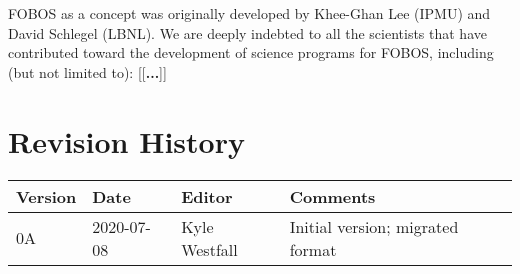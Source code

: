 \documentclass[11pt,a4paper,twoside,onecolumn,openany,final,oldfontcommands]{memoir}
\newcommand{\edit}[2][todo]{{\color{#1}[[{\bf #2}]]}}
\begin{document}
FOBOS as a concept was originally developed by Khee-Ghan Lee (IPMU) and David Schlegel (LBNL).  We are deeply indebted to all the scientists that have contributed toward the development of science programs for FOBOS, including (but not limited to): \edit{...}

\newpage

\chapter*{Revision History}

\begin{table}[hp]{%
\begin{tabular}{l | l | l |  p{22pc}} \toprule
{\bf Version} & {\bf Date} & {\bf Editor} & {\bf Comments} \\ \midrule
0A & 2020-07-08 & Kyle Westfall & Initial version; migrated format \\ \bottomrule
\end{tabular}}
\end{table}



\end{document}

